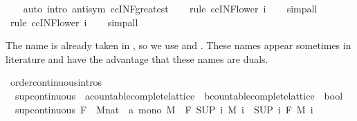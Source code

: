 \begin{isabellebody}
%
\isadelimproof
\ \ %
\endisadelimproof
%
\isatagproof
{}\isamarkupfalse%
\ {\isacharparenleft}auto\ intro{\isacharbang}{\isacharcolon}\ antisym\ ccINF{\isacharunderscore}greatest{\isacharparenright}\isanewline
\ \ \isamarkupfalse%
\ {\isacharparenleft}rule\ ccINF{\isacharunderscore}lower{}{\isacharbrackleft}\ i{\isacharequal}{}{\isacharbrackright}{\isacharparenright}\isanewline
\ \ \isamarkupfalse%
\ simp{\isacharunderscore}all\isanewline
\ \ \isamarkupfalse%
\ {\isacharparenleft}rule\ ccINF{\isacharunderscore}lower{}{\isacharbrackleft}\ i{\isacharequal}{}{\isacharbrackright}{\isacharparenright}\isanewline
\ \ \isamarkupfalse%
\ simp{\isacharunderscore}all\isanewline
\ \ \isamarkupfalse%
%
\endisatagproof
{\isafoldproof}%
%
\isadelimproof
%
\endisadelimproof
%
\begin{isamarkuptext}%
The name  is already taken in , so we use
   and . These names appear sometimes in literature
  and have the advantage that these names are duals.%
\end{isamarkuptext}\isamarkuptrue%
\isamarkupfalse%
\ order{\isacharunderscore}continuous{\isacharunderscore}intros%
\isadelimdocument
%
\endisadelimdocument
%
\isatagdocument
%
\isamarkuptrue%
%
\endisatagdocument
{\isafolddocument}%
%
\isadelimdocument
%
\endisadelimdocument
{}\isamarkupfalse%
\isanewline
\ \ sup{\isacharunderscore}continuous\ {\isacharcolon}{\isacharcolon}\ {\isachardoublequoteopen}{\isacharparenleft}{\isacharprime}a{\isacharcolon}{\isacharcolon}countable{\isacharunderscore}complete{\isacharunderscore}lattice\ {\isasymRightarrow}\ {\isacharprime}b{\isacharcolon}{\isacharcolon}countable{\isacharunderscore}complete{\isacharunderscore}lattice{\isacharparenright}\ {\isasymRightarrow}\ bool{\isachardoublequoteclose}\isanewline
{}\isanewline
\ \ {\isachardoublequoteopen}sup{\isacharunderscore}continuous\ F\ {\isasymlongleftrightarrow}\ {\isacharparenleft}{\isasymforall}M{\isacharcolon}{\isacharcolon}nat\ {\isasymRightarrow}\ {\isacharprime}a{\isachardot}\ mono\ M\ {\isasymlongrightarrow}\ F\ {\isacharparenleft}SUP\ i{\isachardot}\ M\ i{\isacharparenright}\ {\isacharequal}\ {\isacharparenleft}SUP\ i{\isachardot}\ F\ {\isacharparenleft}M\ i{\isacharparenright}{\isacharparenright}{\isacharparenright}{\isachardoublequoteclose}\isanewline

\end{isabellebody}

